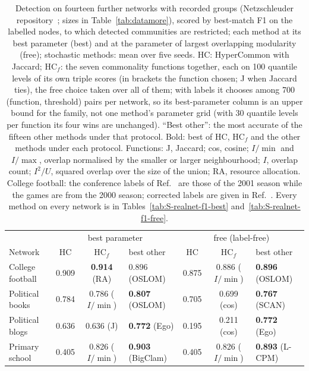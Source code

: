 \begin{table}[t]
\caption{Detection on fourteen further networks with recorded groups (Netzschleuder repository~\cite{peixoto2020netzschleuder}; sizes in Table~\ref{tab:datamore}), scored by best-match F1 on the labelled nodes, to which detected communities are restricted; each method at its best parameter (best) and at the parameter of largest overlapping modularity (free); stochastic methods: mean over five seeds. HC: HyperCommon with Jaccard; HC$_f$: the seven commonality functions together, each on 100 quantile levels of its own triple scores (in brackets the function chosen; J when Jaccard ties), the free choice taken over all of them; with labels it chooses among 700 (function, threshold) pairs per network, so its best-parameter column is an upper bound for the family, not one method's parameter grid (with 30 quantile levels per function its four wins are unchanged). ``Best other'': the most accurate of the fifteen other methods under that protocol. Bold: best of HC, HC$_f$ and the other methods under each protocol. Functions: J, Jaccard; cos, cosine; $I/\min$ and $I/\max$, overlap normalised by the smaller or larger neighbourhood; $I$, overlap count; $I^2/U$, squared overlap over the size of the union; RA, resource allocation. College football: the conference labels of Ref.~\cite{girvan2002community} are those of the 2001 season while the games are from the 2000 season; corrected labels are given in Ref.~\cite{evans2010clique}. Every method on every network is in Tables~\ref{tab:S-realnet-f1-best} and~\ref{tab:S-realnet-f1-free}.}
\label{tab:realmore}
\footnotesize
\begin{ruledtabular}
\begin{tabular}{l|ccl|ccl}
 & \multicolumn{3}{c|}{best parameter} & \multicolumn{3}{c}{free (label-free)} \\
Network & HC & HC$_f$ & best other & HC & HC$_f$ & best other \\
\hline
College football & 0.909 & \textbf{0.914} (RA) & 0.896 (OSLOM) & 0.875 & 0.886 ($I/\min$) & \textbf{0.896} (OSLOM) \\
Political books & 0.784 & 0.786 ($I/\min$) & \textbf{0.807} (OSLOM) & 0.705 & 0.699 (cos) & \textbf{0.767} (SCAN) \\
Political blogs & 0.636 & 0.636 (J) & \textbf{0.772} (Ego) & 0.195 & 0.211 (cos) & \textbf{0.772} (Ego) \\
Primary school & 0.405 & 0.826 ($I/\min$) & \textbf{0.903} (BigClam) & 0.405 & 0.826 ($I/\min$) & \textbf{0.893} (L-CPM) \\

\end{tabular}
\end{ruledtabular}
\end{table}
